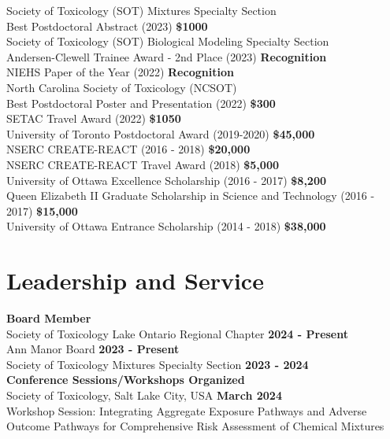 \documentclass[margin,line]{res}
\begin{document}
\begin{resume}
Society of Toxicology (SOT) Mixtures Specialty Section\\
Best Postdoctoral Abstract (2023)
\hfill {\textbf{\$1000}}\\
Society of Toxicology (SOT) Biological Modeling Specialty Section\\
Andersen-Clewell Trainee Award - 2nd Place (2023)
\hfill {\textbf{Recognition}}\\
NIEHS Paper of the Year (2022)
\hfill {\textbf{Recognition}}\\
North Carolina Society of Toxicology (NCSOT)\\
Best Postdoctoral Poster and Presentation (2022)
\hfill {\textbf{\$300}}\\
SETAC Travel Award (2022)
\hfill {\textbf{\$1050}}\\
University of Toronto Postdoctoral Award (2019-2020)
\hfill {\textbf{\$45,000}}\\
NSERC CREATE-REACT (2016 - 2018)
\hfill {\textbf{\$20,000}}\\
NSERC CREATE-REACT Travel Award (2018)
\hfill {\textbf{\$5,000}}\\
University of Ottawa Excellence Scholarship (2016 - 2017)
\hfill {\textbf{\$8,200}}\\
Queen Elizabeth II Graduate Scholarship in Science and Technology (2016 - 2017)
\hfill {\textbf{\$15,000}}\\
University of Ottawa Entrance Scholarship (2014 - 2018)
\hfill {\textbf{\$38,000}}\\

\vspace*{.1in}

\section{\sc Leadership and Service}
{\bf Board Member}\\
{Society of Toxicology Lake Ontario Regional Chapter} \hfill {\bf 2024 - Present}\\
{Ann Manor Board} \hfill {\bf 2023 - Present}\\
{Society of Toxicology Mixtures Specialty Section} \hfill {\bf 2023 - 2024}\\

{\bf Conference Sessions/Workshops Organized}\\
Society of Toxicology, Salt Lake City, USA \hfill {\bf  March 2024}\\
Workshop Session: Integrating Aggregate Exposure Pathways and Adverse Outcome Pathways for Comprehensive Risk Assessment of Chemical Mixtures


\end{resume}
\end{document}
